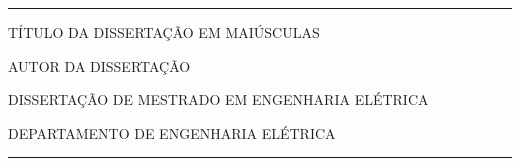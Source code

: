 \frontmatter
\thispagestyle{empty}

\begin{bf}
\hspace{10mm}
\vfill

\begin{center}
\rule{155mm}{0.1mm}

TÍTULO DA DISSERTAÇÃO EM MAIÚSCULAS

\vspace{10mm}

AUTOR DA DISSERTAÇÃO

\vspace{15mm}

DISSERTAÇÃO DE MESTRADO EM ENGENHARIA ELÉTRICA

\vspace{10mm}

DEPARTAMENTO DE ENGENHARIA ELÉTRICA

\rule{155mm}{0.1mm}
\end{center}

\hspace{10mm}
\vfill
\end{bf}

\pagebreak

\thispagestyle{empty}
\hspace{10mm}

\pagebreak
